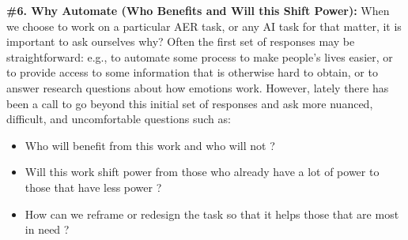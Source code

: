 \documentclass{clv3}
\begin{document}
\noindent \textbf{\#6. Why Automate (Who Benefits and Will this Shift Power):} When we choose to work on a particular AER task, or any AI task for that matter, it is important to ask ourselves why? Often the first set of responses may be straightforward: e.g., to automate some process to make people’s lives easier, or to provide access to some information that is otherwise hard to obtain, or to answer research questions about how emotions work. However, lately there has been a call to go beyond this initial set of responses and ask more nuanced, difficult, and uncomfortable questions such as:\\[-20pt]
\begin{itemize}
    \item Who will benefit from this work and who will not \cite{trewin2019considerations}?
    \item Will this work shift power from those who already have a lot of power to those that have less power \cite{kalluri2020don}?
   \item How can we reframe or redesign the task so that it helps those that are most in need \cite{monteiro2019ruined}?
\end{itemize}
\vspace*{-3mm}

\end{document}
